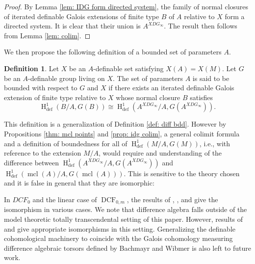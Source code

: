 \documentclass{amsart}
\theoremstyle{definition}
\newtheorem{definition}[theorem]{Definition}
\theoremstyle{remark}
\numberwithin{equation}{section}
\def \defin {\operatorname{def}}
\def \HH {\operatorname{H}}
\def \mcl {\operatorname{mcl}}
\def \DCF {\operatorname{DCF}}
\begin{document}
\begin{proof}
    By Lemma \ref{lem: IDG form directed system}, the family of normal closures of iterated definable Galois extensions of finite type $B$ of $A$ relative to $X$ form a directed system. It is clear that their union is $A^{XDG_\infty}$. The result then follows from Lemma \ref{lem: colim}. 
\end{proof}

We then propose the following definition of a bounded set of parameters $A$.  

\begin{definition}
    Let $X$ be an $A$-definable set satisfying $X(A)= X(M)$. Let $G$ be an $A$-definable group living on $X$.  The set of parameters $A$ is said to be bounded with respect to $G$ and $X$ if there exists an iterated definable Galois extension of finite type relative to $X$ whose normal closure $B$ satisfies $$\HH^{1}_{\defin}(B/A, G(B)) \cong \HH^{1}_{\defin}(A^{XDG_\infty}/A, G(A^{XDG_\infty})).$$
\end{definition}

This definition is a generalization of Definition \ref{def: diff bdd}.  
However by Propositions \ref{thm: mcl points} and \ref{prop: idg colim}, a general colimit formula and a definition of boundedness for all of $\HH^1_{\defin}(M/A,G(M))$, i.e., with reference to the extension $M/A$, would require and understanding of the difference between $\HH^{1}_{\defin}(A^{XDG_\infty}/A, G(A^{XDG_\infty}))$ and  $\HH^{1}_{\defin}(\mcl(A)/A, G(\mcl(A)))$. This is sensitive to the theory chosen and it is false in general that they are isomorphic:
        
In $DCF_0$ and the linear case of $\DCF_{0,m}$, the results of \cite{PILLAY2017809}, \cite{Minchenko_2019}, and \cite{Chatzidakis2017GeneralizedPE} give the isomorphism in various cases. We note that difference algebra falls outside of the model theoretic totally transcendental setting of this paper. However, results of \cite{Chatzidakis2017GeneralizedPE} and \cite{Bachmayr_Wibmer_2026} give appropriate isomorphisms in this setting. Generalizing the definable cohomological machinery to coincide with the Galois cohomology measuring difference algebraic torsors defined by Bachmayr and Wibmer is also left to future work.

















{}

\nocite{*}
\end{document}
